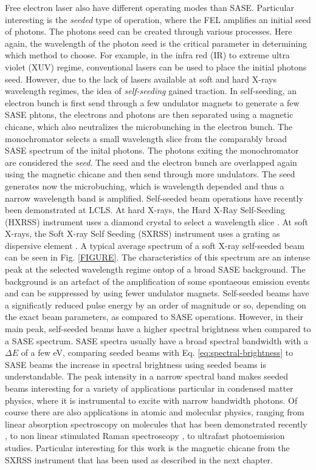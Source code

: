Free electron laser also have different operating modes than SASE. Particular interesting is the \textit{seeded} type of operation, where the FEL amplifies an initial seed of photons. The photons seed can be created through various processes. Here again, the wavelength of the photon seed is the critical parameter in determining which method to choose. For example, in the infra red (IR) to extreme ultra violet (XUV) regime, conventional lasers can be used to place the initial photons seed. However, due to the lack of lasers available at soft and hard X-rays wavelength regimes, the idea of \textit{self-seeding} gained traction. In self-seeding, an electron bunch is first send through a few undulator magnets to generate a few SASE phtons, the electrons and photons are then separated using a magnetic chicane, which also neutralizes the microbunching in the electron bunch. The monochromator selects a small wavelength slice from the comparably broad SASE spectrum of the inital photons. The photons exiting the monochromator are considered the \textit{seed}. The seed and the electron bunch are overlapped again using the magnetic chicane and then send through more undulators. The seed generates now the microbuching, which is wavelength depended and thus a narrow wavelength band is amplified. Self-seeded beam operations have recently been demonstrated at LCLS. At hard X-rays, the Hard X-Ray Self-Seeding (HXRSS) instrument uses a diamond crystal to select a wavelength slice \cite{Amann-2012-NatPho}. At soft X-rays, the Soft X-ray Self Seeding (SXRSS) instrument uses a grating as dispersive element \cite{Ratner-2015-PRL}. A typical average spectrum of a soft X-ray self-seeded beam can be seen in Fig. \ref{FIGURE}. The characteristics of this spectrum are an intense peak at the selected wavelength regime ontop of a broad SASE background. The background is an artefact of the amplification of some spontaeous emission events and can be suppressed by using fewer undulator magnets. Self-seeded beams have a significatly reduced pulse energy by an order of magnitude or so, depending on the exact beam parameters, as compared to SASE operations. However, in their main peak, self-seeded beams have a higher spectral brightness when compared to a SASE spectrum. SASE spectra usually have a broad spectral bandwidth with a $\Delta E$ of a few eV, comparing seeded beams with Eq. \ref{eq:spectral-brightness} to SASE beams the increase in spectral brightness using seeded beams is understandable. The peak intensity in a narrow spectral band makes seeded beams interesting for a variety of applications particular in condensed matter physics, where it is instrumental to excite with narrow bandwidth photons. Of course there are also applications in atomic and molecular physics, ranging from linear absorption spectroscopy on molecules that has been demonstrated recently \cite{UNPUBLISHED}, to non linear stimulated Raman spectroscopy \cite{Kimberg-2016-FD}, to ultrafast photoemission studies. Particular interesting for this work is the magnetic chicane from the SXRSS instrument that has been used as described in the next chapter.
